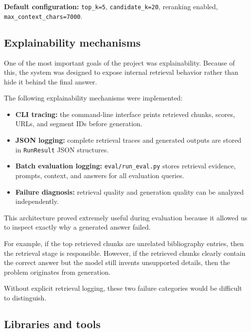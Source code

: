 \documentclass[11pt,a4paper]{article}
\begin{document}
\textbf{Default configuration:} \texttt{top\_k=5}, \texttt{candidate\_k=20}, reranking enabled, \texttt{max\_context\_chars=7000}.

\subsection{Explainability mechanisms}
One of the most important goals of the project was explainability. Because of this, the system was designed to expose internal retrieval behavior rather than hide it behind the final answer.

The following explainability mechanisms were implemented:

\begin{itemize}
  \item \textbf{CLI tracing:} the command-line interface prints retrieved chunks, scores, URLs, and segment IDs before generation.

  \item \textbf{JSON logging:} complete retrieval traces and generated outputs are stored in \texttt{RunResult} JSON structures.

  \item \textbf{Batch evaluation logging:} \texttt{eval/run\_eval.py} stores retrieval evidence, prompts, context, and answers for all evaluation queries.

  \item \textbf{Failure diagnosis:} retrieval quality and generation quality can be analyzed independently.
\end{itemize}

This architecture proved extremely useful during evaluation because it allowed us to inspect exactly why a generated answer failed.

For example, if the top retrieved chunks are unrelated bibliography entries, then the retrieval stage is responsible. However, if the retrieved chunks clearly contain the correct answer but the model still invents unsupported details, then the problem originates from generation.

Without explicit retrieval logging, these two failure categories would be difficult to distinguish.

\subsection{Libraries and tools}
\end{document}
